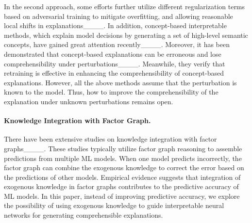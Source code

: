In the second approach, some efforts further utilize different regularization terms based on adversarial training to mitigate overfitting, and allowing reasonable local shifts in explanations____.
In addition, concept-based interpretable methods, which explain model decisions by generating a set of high-level semantic concepts, have gained great attention recently____.
Moreover, it has been demonstrated that concept-based explanations can be erroneous and lose comprehensibility under perturbations____.
Meanwhile, they verify that retraining is effective in enhancing the comprehensibility of concept-based explanations.
However, all the above methods assume that the perturbation is known to the model. Thus, how to improve the comprehensibility of the explanation under unknown perturbations remains open.

\paragraph{Knowledge Integration with Factor Graph.} 
There have been extensive studies on knowledge integration with factor graphs____.
These studies typically utilize factor graph reasoning to assemble predictions from multiple ML models.
When one model predicts incorrectly, the factor graph can combine the exogenous knowledge to correct the error based on the predictions of other models.
Empirical evidence suggests that integration of exogenous knowledge in factor graphs contributes to the predictive accuracy of ML models.
In this paper, instead of improving predictive accuracy, we explore the possibility of using exogenous knowledge to guide interpretable neural networks for generating comprehensible explanations.